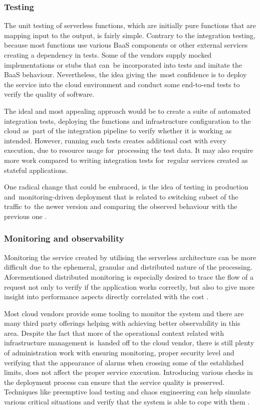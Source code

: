 \subsubsection{Testing} \label{chapter:serverless-testing}

The unit testing of serverless functions, which are initially pure functions that are mapping input to the output, is fairly simple. Contrary to the integration testing, because most functions use various BaaS components or other external services creating a dependency in tests. Some of the vendors supply mocked implementations or stubs that can~be incorporated into tests and imitate the BaaS behaviour. Nevertheless, the idea giving the~most confidence is to deploy the service into the cloud environment and conduct some end-to-end tests to verify the quality of software.

The ideal and most appealing approach would be to create a suite of automated integration tests, deploying the functions and infrastructure configuration to the cloud as~part of the integration pipeline to verify whether it is working as intended. However, running such tests creates additional cost with every execution, due to resource usage for~processing the test data. It may also require more work compared to writing integration tests for~regular services created as stateful applications. 

One radical change that could be embraced, is the idea of testing in production and~monitoring-driven deployment that is related to switching subset of the traffic to~the newer version and comparing the observed behaviour with the previous one \cite{MartinFowlerServerless}.

\subsubsection{Monitoring and observability} \label{chapter:serverless-monitoring-and-observability}

Monitoring the service created by utilising the serverless architecture can be more difficult due to the ephemeral, granular and distributed nature of the processing. Aforementioned distributed monitoring is especially desired to trace the flow of a request not only to verify if the application works correctly, but also to give more insight into performance aspects directly correlated with the cost \cite{LeveragingServerlessCloudComputingArchitectures}.

Most cloud vendors provide some tooling to monitor the system and there are many third party offerings helping with achieving better observability in this area. Despite the fact that more of the operational context related with infrastructure management is~handed off to the cloud vendor, there is still plenty of administration work with ensuring monitoring, proper security level and verifying that the appearance of alarms when crossing some of the established limits, does not affect the proper service execution. Introducing various checks in the deployment process can ensure that the service quality is preserved. Techniques like preemptive load testing and chaos engineering can help simulate various critical situations and verify that the system is able to cope with them \cite{MartinFowlerServerless}.

